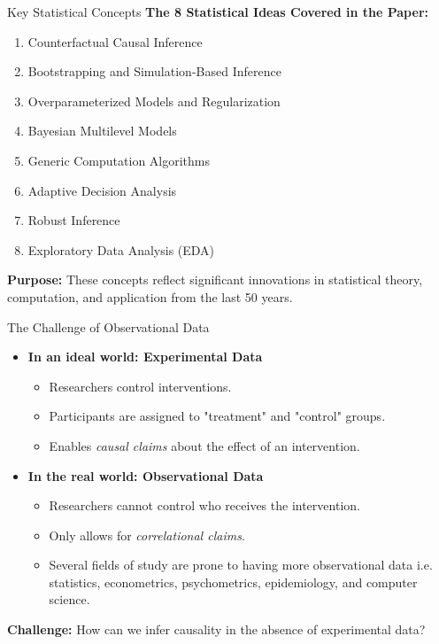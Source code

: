 \documentclass{beamer}
\begin{document}
\begin{frame}{Key Statistical Concepts}
\textbf{The 8 Statistical Ideas Covered in the Paper:}
\begin{enumerate}
    \item Counterfactual Causal Inference
    \item Bootstrapping and Simulation-Based Inference
    \item Overparameterized Models and Regularization
    \item Bayesian Multilevel Models
    \item Generic Computation Algorithms
    \item Adaptive Decision Analysis
    \item Robust Inference
    \item Exploratory Data Analysis (EDA)
\end{enumerate}

\vspace{0.5cm}

\textbf{Purpose:} These concepts reflect significant innovations in statistical theory, computation, and application from the last 50 years.
\end{frame}


\begin{frame}{The Challenge of Observational Data}
\begin{itemize}
    \item \textbf{In an ideal world: Experimental Data}
    \begin{itemize}
        \item Researchers control interventions.
        \item Participants are assigned to "treatment" and "control" groups.
        \item Enables \textit{causal claims} about the effect of an intervention.
    \end{itemize}
    \item \textbf{In the real world: Observational Data}
    \begin{itemize}
        \item Researchers cannot control who receives the intervention.
        \item Only allows for \textit{correlational claims}.
        \item Several fields of study are prone to having more observational data i.e. statistics, econometrics, psychometrics, epidemiology, and computer science.
    \end{itemize}
\end{itemize}

\vspace{0.5cm}

\textbf{Challenge:} How can we infer causality in the absence of experimental data?
\end{frame}
\end{document}
